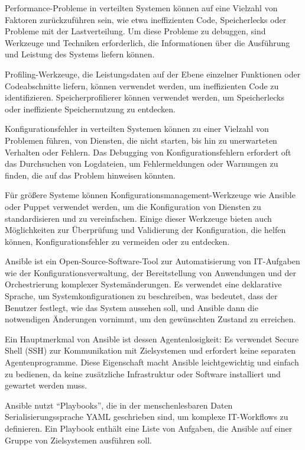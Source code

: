 Performance-Probleme in verteilten Systemen können auf eine Vielzahl von Faktoren zurückzuführen sein, wie etwa ineffizienten Code, Speicherlecks oder Probleme mit der Lastverteilung. Um diese Probleme zu debuggen, sind Werkzeuge und Techniken erforderlich, die Informationen über die Ausführung und Leistung des Systems liefern können.

Profiling-Werkzeuge, die Leistungsdaten auf der Ebene einzelner Funktionen oder Codeabschnitte liefern, können verwendet werden, um ineffizienten Code zu identifizieren. Speicherprofilierer können verwendet werden, um Speicherlecks oder ineffiziente Speichernutzung zu entdecken. 

Konfigurationsfehler in verteilten Systemen können zu einer Vielzahl von Problemen führen, von Diensten, die nicht starten, bis hin zu unerwarteten Verhalten oder Fehlern. Das Debugging von Konfigurationsfehlern erfordert oft das Durchsuchen von Logdateien, um Fehlermeldungen oder Warnungen zu finden, die auf das Problem hinweisen könnten.

Für größere Systeme können Konfigurationsmanagement-Werkzeuge wie Ansible oder Puppet verwendet werden, um die Konfiguration von Diensten zu standardisieren und zu vereinfachen. Einige dieser Werkzeuge bieten auch Möglichkeiten zur Überprüfung und Validierung der Konfiguration, die helfen können, Konfigurationsfehler zu vermeiden oder zu entdecken.

Ansible ist ein Open-Source-Software-Tool zur Automatisierung von IT-Aufgaben wie der Konfigurationsverwaltung, der Bereitstellung von Anwendungen und der Orchestrierung komplexer Systemänderungen. Es verwendet eine deklarative Sprache, um Systemkonfigurationen zu beschreiben, was bedeutet, dass der Benutzer festlegt, wie das System aussehen soll, und Ansible dann die notwendigen Änderungen vornimmt, um den gewünschten Zustand zu erreichen.

Ein Hauptmerkmal von Ansible ist dessen Agentenlosigkeit: Es verwendet Secure Shell (SSH) zur Kommunikation mit Zielsystemen und erfordert keine separaten Agentenprogramme. Diese Eigenschaft macht Ansible leichtgewichtig und einfach zu bedienen, da keine zusätzliche Infrastruktur oder Software installiert und gewartet werden muss.

Ansible nutzt \enquote{Playbooks}, die in der menschenlesbaren Daten Serialisierungssprache YAML geschrieben sind, um komplexe IT-Workflows zu definieren. Ein Playbook enthält eine Liste von Aufgaben, die Ansible auf einer Gruppe von Zielsystemen ausführen soll.

